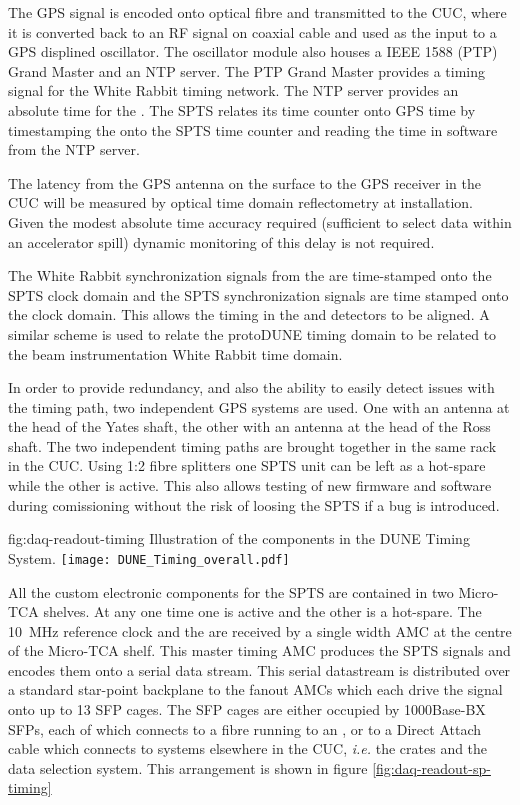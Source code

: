 The GPS signal is encoded onto optical fibre and transmitted to the
CUC, where it is converted back to an RF signal on coaxial cable and
used as the input to a GPS displined oscillator. The oscillator module
also houses a IEEE 1588 (PTP) Grand Master and an NTP server. The PTP
Grand Master provides a timing signal for the  White Rabbit
timing network. The NTP server provides an absolute time for the
. The SPTS relates its time counter onto GPS time by
timestamping the  onto the SPTS time counter and reading
the time in software from the NTP server.

The latency from the GPS antenna on the surface to the GPS receiver in
the CUC will be measured by optical time domain reflectometry at
installation. Given the modest absolute time accuracy required
(sufficient to select data within an accelerator spill) dynamic
monitoring of this delay is not required.

The White Rabbit synchronization signals from the   are
time-stamped onto the SPTS clock domain and the SPTS synchronization
signals are time stamped onto the  clock domain. This allows
the timing in the  and  detectors to be
aligned. A similar scheme is used to relate the  protoDUNE
 timing domain to be related to the beam instrumentation
White Rabbit time domain.

In order to provide redundancy, and also the ability to easily detect
issues with the timing path, two independent GPS systems are used. One
with an antenna at the head of the Yates shaft, the other with an
antenna at the head of the Ross shaft. The two independent timing
paths are brought together in the same rack in the CUC. Using 1:2
fibre splitters one SPTS unit can be left as a hot-spare while the
other is active. This also allows testing of new firmware and software
during comissioning without the risk of loosing the SPTS if a bug is
introduced.


\begin{dunefigure}{fig:daq-readout-timing}
  {Illustration of the components in the DUNE Timing System.}
\texttt{[image: DUNE\_Timing\_overall.pdf]}
\end{dunefigure}

All the custom electronic components for the SPTS are contained in two
Micro-TCA shelves. At any one time one is active and the other is a
hot-spare. The \SI{10}{\MHz} reference clock and the  are received
by a single width AMC at the centre of the Micro-TCA shelf. This
master timing AMC produces the SPTS signals and encodes them onto a
serial data stream. This serial datastream is distributed over a
standard star-point backplane to the fanout AMCs which each drive the
signal onto up to 13 SFP cages. The SFP cages are either occupied by
1000Base-BX SFPs, each of which connects to a fibre running to an ,
or to a Direct Attach cable which connects to systems elsewhere in the
CUC, {\it i.e.} the  crates and the data selection system. This
arrangement is shown in figure \ref{fig:daq-readout-sp-timing}


